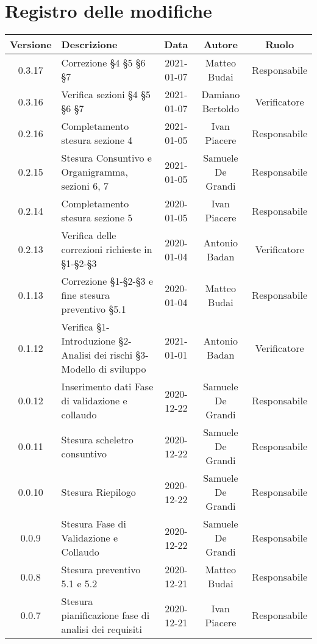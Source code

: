 \section*{Registro delle modifiche}

\begin{center}
	\begin{longtable}{|c|p{5cm}|c|c|c|}
	\hline
	\rowcolor{lighter-grayer}
	\textbf{Versione} & \textbf{Descrizione} & \textbf{Data} & \textbf{Autore} & \textbf{Ruolo} \\
	\hline
	\endfirsthead

	0.3.17 & Correzione §4 §5 §6 §7 & 2021-01-07 & Matteo Budai & Responsabile \\
	0.3.16 & Verifica sezioni §4 §5 §6 §7 & 2021-01-07 & Damiano Bertoldo & Verificatore \\
	\hline
	0.2.16 & Completamento stesura sezione 4 & 2021-01-05 & Ivan Piacere & Responsabile \\
	\hline
	0.2.15 & Stesura Consuntivo e Organigramma, sezioni 6, 7 & 2021-01-05 & Samuele De Grandi & Responsabile \\
	\hline
	0.2.14 & Completamento stesura sezione 5 & 2020-01-05 & Ivan Piacere & Responsabile \\
	\hline
	0.2.13 & Verifica delle correzioni richieste in §1-§2-§3 & 2020-01-04 & Antonio Badan & Verificatore \\
	\hline
	0.1.13 & Correzione §1-§2-§3 e fine stesura preventivo §5.1 & 2020-01-04 & Matteo Budai & Responsabile \\
	\hline
	0.1.12 & Verifica §1-Introduzione §2-Analisi dei rischi §3-Modello di sviluppo & 2021-01-01 & Antonio Badan & Verificatore \\
	\hline
	0.0.12 & Inserimento dati Fase di validazione e collaudo & 2020-12-22 & Samuele De Grandi & Responsabile \\
	\hline
	0.0.11 & Stesura scheletro consuntivo & 2020-12-22 & Samuele De Grandi & Responsabile \\
	\hline
	0.0.10 & Stesura Riepilogo & 2020-12-22 & Samuele De Grandi & Responsabile \\
	\hline
	0.0.9 & Stesura Fase di Validazione e Collaudo & 2020-12-22 & Samuele De Grandi & Responsabile \\
	\hline
	0.0.8 & Stesura preventivo 5.1 e 5.2 & 2020-12-21 & Matteo Budai & Responsabile \\
	\hline
	0.0.7 & Stesura pianificazione fase di analisi dei requisiti & 2020-12-21 & Ivan Piacere & Responsabile \\

\end{longtable}
\end{center}
